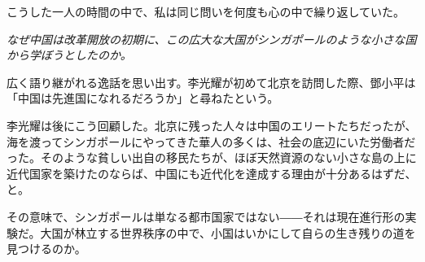 こうした一人の時間の中で、私は同じ問いを何度も心の中で繰り返していた。

\begin{center}
\textit{なぜ中国は改革開放の初期に、この広大な大国がシンガポールのような小さな国から学ぼうとしたのか。}
\end{center}

広く語り継がれる逸話を思い出す。李光耀が初めて北京を訪問した際、鄧小平は「中国は先進国になれるだろうか」と尋ねたという。

李光耀は後にこう回顧した。北京に残った人々は中国のエリートたちだったが、海を渡ってシンガポールにやってきた華人の多くは、社会の底辺にいた労働者だった。そのような貧しい出自の移民たちが、ほぼ天然資源のない小さな島の上に近代国家を築けたのならば、中国にも近代化を達成する理由が十分あるはずだ、と。

その意味で、シンガポールは単なる都市国家ではない――それは現在進行形の実験だ。大国が林立する世界秩序の中で、小国はいかにして自らの生き残りの道を見つけるのか。
